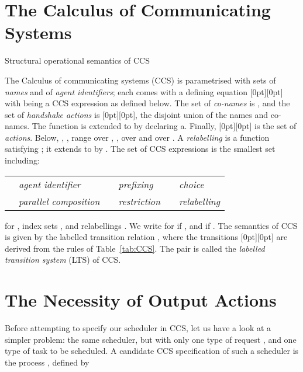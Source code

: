 \documentclass[smallcondensed]{svjour3}
\newcommand{\plat}[1]{\raisebox{0pt}[0pt][0pt]{#1}}  \def\precond#1{{\vphantom{#1}}^\bullet #1}
\newcommand{\Tab}[1]{Table~\ref{tab:#1}}
\begin{document}
\section{The Calculus of Communicating Systems}\label{sec:CCS}


\begin{table}[t]
\normalsize
\begin{center}
\framebox{}
\end{center}
\caption{Structural operational semantics of CCS}
\label{tab:CCS}
\end{table}

The Calculus of communicating systems (CCS) \cite{Mi89} is parametrised with sets  of {\em names} and  of {\em agent identifiers};
\vspace{2pt}each  comes with a defining equation \plat{}
with  being a CCS expression as defined below.
The set  of {\em co-names} is , and 
the set  of \emph{handshake actions} is 
\plat{}, the disjoint union of the names and co-names.
The function  is extended to  by declaring
a. Finally, \plat{} is the set of
{\em actions}. Below, , ,  range over ,
,  over  and  over .
A \emph{relabelling} is a function  satisfying
; it extends to  by .
The set  of CCS expressions is the smallest set including:
\begin{center}
\begin{tabular}{@{}l@{~~}l@{\qquad\quad}l@{~~}l@{\qquad\quad}l@{~~}l@{}}
 &  \emph{agent identifier} &
  & \emph{prefixing}&
  & \emph{choice} \\
 & \emph{parallel composition}&
  & \emph{restriction} &
 &  \emph{relabelling} \\
\end{tabular}
\end{center}
\noindent for , index sets , and relabellings .
We write  for  if , and  if .
The semantics of CCS is given by the labelled transition relation
, where the transitions 
\plat{}
are derived from the rules of \Tab{CCS}.
The pair  is called the \emph{labelled transition system} (LTS)
of CCS\@.

\section{The Necessity of Output Actions}\label{sec:progress}


\newcommand{\D}{\ensuremath{F}}
\newcommand{\Do}{\ensuremath{F_{0}}}
Before attempting to specify our scheduler in CCS, let us have a look at a
simpler problem: the same scheduler, but with only one type of request ,
and one type of task  to be scheduled. A candidate CCS
specification of such a scheduler is the process , defined by\vspace{-1ex}
\end{document}

